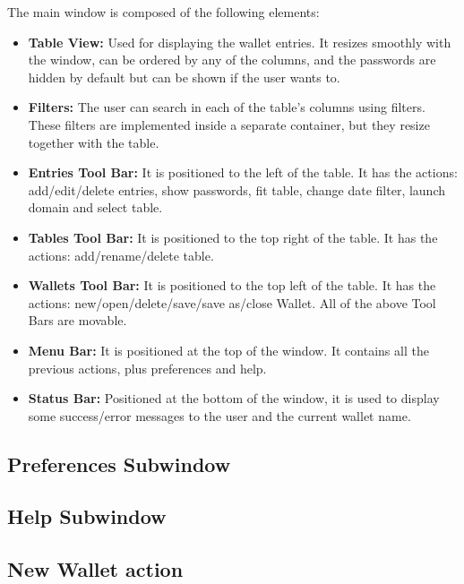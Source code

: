 The main window is composed of the following elements:

\begin{itemize}
\setlength\itemsep{0pt}
\item \textbf{Table View:} Used for displaying the wallet entries. It resizes smoothly with the window, can be ordered by any of the columns, and the passwords are hidden by default but can be shown if the user wants to.
\item \textbf{Filters:} The user can search in each of the table's columns using filters. These filters are implemented inside a separate container, but they resize together with the table.
\item \textbf{Entries Tool Bar:} It is positioned to the left of the table. It has the actions: add/edit/delete entries, show passwords, fit table, change date filter, launch domain and select table.
\item \textbf{Tables Tool Bar:} It is positioned to the top right of the table. It has the actions: add/rename/delete table.
\item \textbf{Wallets Tool Bar:} It is positioned to the top left of the table. It has the actions: new/open/delete/save/save as/close Wallet. 
All of the above Tool Bars are movable.
\item \textbf{Menu Bar:} It is positioned at the top of the window. It contains all the previous actions, plus preferences and help.
\item \textbf{Status Bar:} Positioned at the bottom of the window, it is used to display some success/error messages to the user and the current wallet name.
\end{itemize}


\subsection{Preferences Subwindow}
\subsection{Help Subwindow}

\subsection{New Wallet action}

